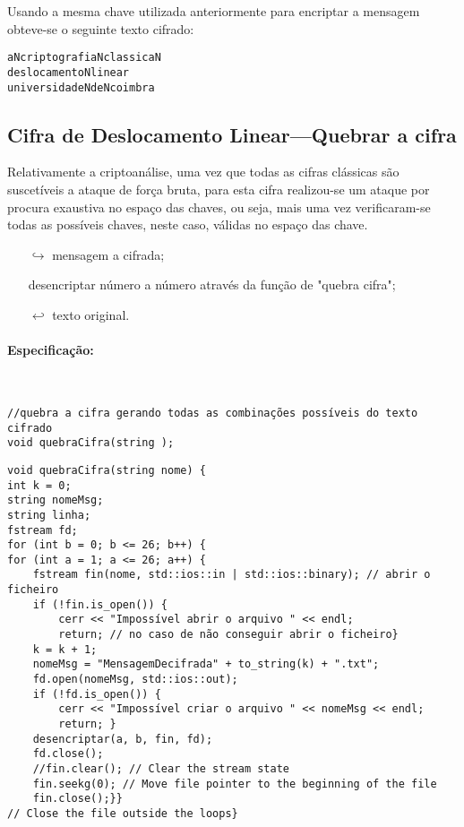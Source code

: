Usando a mesma chave utilizada anteriormente para encriptar a mensagem obteve-se o seguinte texto cifrado:
\begin{verbatim}
aNcriptografiaNclassicaN
deslocamentoNlinear
universidadeNdeNcoimbra
\end{verbatim}

\subsection{Cifra de Deslocamento Linear---Quebrar a cifra}
\label{sec:cdlQuebrarCifra}

Relativamente a criptoanálise, uma vez que todas as cifras clássicas
são suscetíveis a ataque de força bruta, para esta cifra realizou-se
um ataque por procura exaustiva no espaço das chaves, ou seja, mais
uma vez  verificaram-se todas as possíveis chaves, neste caso, válidas no espaço das chave.


\begin{itemize}
    \item[$\hookrightarrow$] mensagem a cifrada;
    \item[]  desencriptar número a número através da função de "quebra cifra";
    \item[$\hookleftarrow$] texto original.
\end{itemize}

\paragraph{Especificação:} {\ }

\begin{lstlisting}[frame=single,mathescape=true,caption={Cifra de Deslocamento Linear---Especificação de \texttt{cifraQuebraCifra}},captionpos=b,label={lst:DeslocamentoLinearCifraQuebraCifra},basicstyle=\footnotesize]
//quebra a cifra gerando todas as combinações possíveis do texto cifrado
void quebraCifra(string );
\end{lstlisting}
\begin{lstlisting}[frame=single,mathescape=true,caption={Quebrar a cifra},captionpos=b,label={lst:Quebrar a cifra},basicstyle=\footnotesize]
void quebraCifra(string nome) {
int k = 0;
string nomeMsg;
string linha;
fstream fd;
for (int b = 0; b <= 26; b++) {
for (int a = 1; a <= 26; a++) {
    fstream fin(nome, std::ios::in | std::ios::binary); // abrir o ficheiro
    if (!fin.is_open()) {
        cerr << "Impossível abrir o arquivo " << endl;
        return; // no caso de não conseguir abrir o ficheiro}
    k = k + 1;
    nomeMsg = "MensagemDecifrada" + to_string(k) + ".txt";
    fd.open(nomeMsg, std::ios::out);
    if (!fd.is_open()) {
        cerr << "Impossível criar o arquivo " << nomeMsg << endl;
        return; }
    desencriptar(a, b, fin, fd);
    fd.close();
    //fin.clear(); // Clear the stream state
    fin.seekg(0); // Move file pointer to the beginning of the file
    fin.close();}}
// Close the file outside the loops}
\end{lstlisting}

